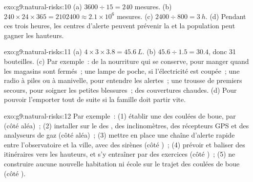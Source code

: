 \begin{solution}{exo:g9:natural-risks:10}
(a) $3600 \div 15 = 240$ mesures. (b) $240 \times 24 \times 365 =
\num{2102400} \approx 2.1 \times 10^6$ mesures. (c) $2400 \div 800 =
\qty{3}{h}$. (d) Pendant ces trois heures, les centres d'alerte peuvent
prévenir la  et la population peut gagner les hauteurs.
\end{solution}

\begin{solution}{exo:g9:natural-risks:11}
(a) $4 \times 3 \times 3.8 = \qty{45.6}{L}$. (b) $45.6 \div 1.5 = 30.4$,
donc 31 bouteilles. (c) Par exemple~: de la nourriture qui se conserve,
pour manger quand les magasins sont fermés~; une lampe de poche, si
l'électricité est coupée~; une radio à piles ou à manivelle, pour
entendre les alertes~; une trousse de premiers secours, pour soigner les
petites blessures~; des couvertures chaudes. (d) Pour pouvoir l'emporter
tout de suite si la famille doit partir vite.
\end{solution}

\begin{solution}{exo:g9:natural-risks:12}
Par exemple~: (1) établir une  des coulées de boue, 
par  (côté aléa)~; (2) installer sur le  des , des
inclinomètres, des récepteurs GPS et des analyseurs de gaz (côté aléa)~;
(3) mettre en place une chaîne d'alerte rapide entre l'observatoire et la
ville, avec des sirènes (côté )~; (4) prévoir et baliser des
itinéraires vers les hauteurs, et s'y entraîner par des exercices (côté
)~; (5) ne construire aucune nouvelle habitation ni école sur
le trajet des coulées de boue (côté ).
\end{solution}

